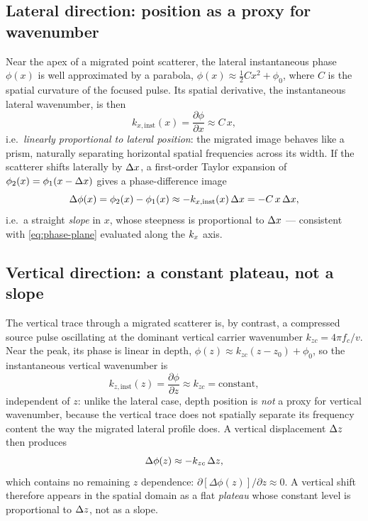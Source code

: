 \subsection{Lateral direction: position as a proxy for wavenumber}

Near the apex of a migrated point scatterer, the lateral instantaneous phase
$\phi(x)$ is well approximated by a parabola, $\phi(x)\approx\tfrac12 Cx^2+\phi_0$,
where $C$ is the spatial curvature of the focused pulse. Its spatial
derivative, the instantaneous lateral wavenumber, is then
\begin{equation}
  k_{x,\mathrm{inst}}(x) = \frac{\partial\phi}{\partial x} \approx C\,x,
  \label{eq:kx-inst}
\end{equation}
i.e.\ \emph{linearly proportional to lateral position}: the migrated image
behaves like a prism, naturally separating horizontal spatial frequencies
across its width. If the scatterer shifts laterally by $\Delta x$, a first-order
Taylor expansion of $\phi_2(x)=\phi_1(x-\Delta x)$ gives a phase-difference image
\begin{equation}
  \Delta\phi(x) = \phi_2(x)-\phi_1(x) \approx -k_{x,\mathrm{inst}}(x)\,\Delta x
    = -C\,x\,\Delta x ,
  \label{eq:dphi-lateral}
\end{equation}
i.e.\ a straight \emph{slope} in $x$, whose steepness is proportional to
$\Delta x$ — consistent with \cref{eq:phase-plane} evaluated along the $k_x$ axis.

\subsection{Vertical direction: a constant plateau, not a slope}

The vertical trace through a migrated scatterer is, by contrast, a
compressed source pulse oscillating at the dominant vertical carrier
wavenumber $k_{zc}=4\pi f_c/v$. Near the peak, its phase is linear in depth,
$\phi(z)\approx k_{zc}(z-z_0)+\phi_0$, so the instantaneous vertical
wavenumber is
\begin{equation}
  k_{z,\mathrm{inst}}(z) = \frac{\partial\phi}{\partial z} \approx k_{zc}
  = \text{constant} ,
  \label{eq:kz-inst}
\end{equation}
independent of $z$: unlike the lateral case, depth position is \emph{not} a
proxy for vertical wavenumber, because the vertical trace does not spatially
separate its frequency content the way the migrated lateral profile does.
A vertical displacement $\Delta z$ then produces
\begin{equation}
  \Delta\phi(z) \approx -k_{zc}\,\Delta z ,
  \label{eq:dphi-vertical}
\end{equation}
which contains no remaining $z$ dependence: $\partial[\Delta\phi(z)]/\partial z\approx0$.
A vertical shift therefore appears in the spatial domain as a flat
\emph{plateau} whose constant level is proportional to $\Delta z$, not as a slope.

